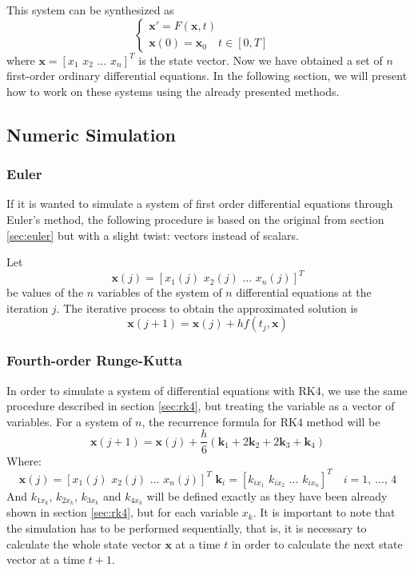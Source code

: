 This system can be synthesized as 
\begin{equation}\label{eq:syn_sys_odes}
\begin{cases}
    \mathbf{x}'=F(\mathbf{x},t) &\\ \mathbf{x}(0) = \mathbf{x}_0\quad t\in[0,T]&
\end{cases}
\end{equation}
where $\mathbf{x}=[x_1\,\,x_2\,\,...\,\,x_n]^T$ is the state vector. Now we have obtained a set of $n$ first-order ordinary differential equations. In the following section, we will present how to work on these systems using the already presented methods.

\subsection{Numeric Simulation}
    \subsubsection{Euler}
    If it is wanted to simulate a system of first order differential equations through Euler's method, the following procedure is based on the original from section \ref{sec:euler} but with a slight twist: vectors instead of scalars.

    Let \[\mathbf{x}(j)=\left[x_1(j)\,\,x_2(j)\,\,\dots\,\, x_n(j)\right]^T\]
    be values of the $n$ variables of the system of $n$ differential equations at the iteration $j$. The iterative process to obtain the approximated solution is
    \begin{equation}
        \mathbf{x}(j+1)= \mathbf{x}(j)+hf(t_j,\mathbf{x})
    \end{equation}
    
    
    \subsubsection{Fourth-order Runge-Kutta}
    In order to simulate a system of differential equations with RK4, we use the same procedure described in section \ref{sec:rk4}, but treating the variable as a vector of variables. For a system of $n$, the recurrence formula for RK4 method will be
    \begin{equation}
        \mathbf{x}\left(j+1\right) = \mathbf{x}(j) + \dfrac{h}{6}\left(\mathbf{k}_1 + 2\mathbf{k}_2 + 2\mathbf{k}_3 + \mathbf{k}_4\right)
    \end{equation}
    Where: \[\mathbf{x}(j)=\left[x_1(j)\,\,x_2(j)\,\,\dots\,\, x_n(j)\right]^T\,\,\mathbf{k}_i=\left[k_{ix_1}\,\, k_{ix_2}\,\,\dots\,\, k_{ix_n}\right]^T\quad i=1,\,\dots,\,4\]
    And $k_{1x_k}$, $k_{2x_k}$, $k_{3x_k}$ and $k_{4x_k}$ will be defined exactly as they have been already shown in section \ref{sec:rk4}, but for each variable $x_k$. It is important to note that the simulation has to be performed sequentially, that is, it is necessary to calculate the whole state vector $\mathbf{x}$ at a time $t$ in order to calculate the next state vector at a time $t+1$.

